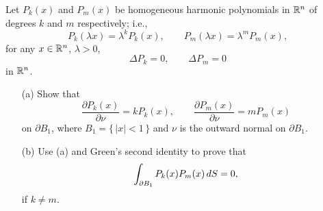 \begin{problem}
  Let \(P_k(x)\) and \(P_m(x)\) be homogeneous harmonic polynomials in
  \(\mathbb{R}^n\) of degrees \(k\) and \(m\) respectively; i.e.,
  \[
    P_k(\lambda x)=\lambda^kP_k(x),\qquad P_m(\lambda x)=\lambda^mP_m(x),
  \]
  for any \(x\in\mathbb{R}^n\), \(\lambda>0\),
  \[
    \Delta P_k=0,\qquad\Delta P_m=0
  \]
  in \(\mathbb{R}^n\).
  \begin{itemize}[noitemsep]
  \item[(a)] Show that
    \[
      \frac{\partial P_k(x)}{\partial\nu}=kP_k(x),\qquad
      \frac{\partial P_m(x)}{\partial \nu}=mP_m(x)
    \]
    on \(\partial B_1\), where \(B_1=\{\,|x|<1\,\}\) and \(\nu\) is the
    outward normal on \(\partial B_1\).
  \item[(b)] Use (a) and Green's second identity to prove that
    \[
      \int_{\partial B_1} P_k(x)P_m(x)\mathop{}\!d S=0,
    \]
    if \(k\neq m\).
  \end{itemize}
\end{problem}
\begin{solution*}
\end{solution*}

